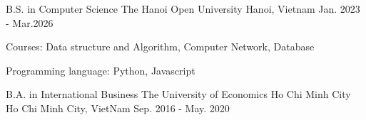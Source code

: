 \begin{cventries} %
  \cventry
    {B.S. in Computer Science} %
    {The Hanoi Open University } %
    {Hanoi, Vietnam} %
    {Jan. 2023 - Mar.2026} %
    {
      \begin{cvitems} %
        \item {Courses: Data structure and Algorithm, Computer Network, Database}
        \item {Programming language: Python, Javascript}
      \end{cvitems}
    }

   \cventry
    {B.A. in International Business} %
    {The University of Economics Ho Chi Minh City} %
    {Ho Chi Minh City, VietNam} %
    {Sep. 2016 - May. 2020} %
    {
      \begin{cvitems} %
      \end{cvitems}
    }

\end{cventries}
